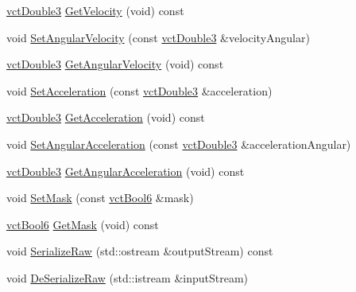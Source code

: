 \begin{DoxyCompactItemize}
\item 
\hyperlink{vct_fixed_size_vector_types_8h_a4a89122c9d7f72c3f31fe8126e17c3af}{vct\-Double3} \hyperlink{classprm_velocity_cartesian_set_abf320f73098c702eabbbac9bcb041a88}{Get\-Velocity} (void) const 
\item 
void \hyperlink{classprm_velocity_cartesian_set_a33f3ab55adb10f0d4756f2a1ec99fed1}{Set\-Angular\-Velocity} (const \hyperlink{vct_fixed_size_vector_types_8h_a4a89122c9d7f72c3f31fe8126e17c3af}{vct\-Double3} \&velocity\-Angular)
\item 
\hyperlink{vct_fixed_size_vector_types_8h_a4a89122c9d7f72c3f31fe8126e17c3af}{vct\-Double3} \hyperlink{classprm_velocity_cartesian_set_a2f5fe2e6f1d1a1d6da842b26849c7594}{Get\-Angular\-Velocity} (void) const 
\item 
void \hyperlink{classprm_velocity_cartesian_set_af0cd3b20970a8c0e8e002bc9756a10d1}{Set\-Acceleration} (const \hyperlink{vct_fixed_size_vector_types_8h_a4a89122c9d7f72c3f31fe8126e17c3af}{vct\-Double3} \&acceleration)
\item 
\hyperlink{vct_fixed_size_vector_types_8h_a4a89122c9d7f72c3f31fe8126e17c3af}{vct\-Double3} \hyperlink{classprm_velocity_cartesian_set_a179c51777f722bef8a29cdaac51ec55d}{Get\-Acceleration} (void) const 
\item 
void \hyperlink{classprm_velocity_cartesian_set_ace697cbb58e5a388248fd2439c3d405f}{Set\-Angular\-Acceleration} (const \hyperlink{vct_fixed_size_vector_types_8h_a4a89122c9d7f72c3f31fe8126e17c3af}{vct\-Double3} \&acceleration\-Angular)
\item 
\hyperlink{vct_fixed_size_vector_types_8h_a4a89122c9d7f72c3f31fe8126e17c3af}{vct\-Double3} \hyperlink{classprm_velocity_cartesian_set_a62666b656d443706e3c1c0cd7f22ed8d}{Get\-Angular\-Acceleration} (void) const 
\item 
void \hyperlink{classprm_velocity_cartesian_set_a69b5d82c093c1d279ae38b9cde075da4}{Set\-Mask} (const \hyperlink{vct_fixed_size_vector_types_8h_a1494a41869ce763813f2bf7f922b8fdd}{vct\-Bool6} \&mask)
\item 
\hyperlink{vct_fixed_size_vector_types_8h_a1494a41869ce763813f2bf7f922b8fdd}{vct\-Bool6} \hyperlink{classprm_velocity_cartesian_set_a9af002d206c1299609cb28aa49551433}{Get\-Mask} (void) const 
\item 
void \hyperlink{classprm_velocity_cartesian_set_a0f26231bf3105e057464f0eae85f7765}{Serialize\-Raw} (std\-::ostream \&output\-Stream) const 
\item 
void \hyperlink{classprm_velocity_cartesian_set_a8027cb74c7c236b631e097308260edd2}{De\-Serialize\-Raw} (std\-::istream \&input\-Stream)
\end{DoxyCompactItemize}
